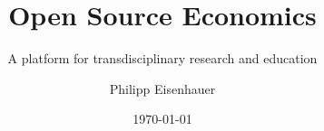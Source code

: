 
\title{Open Source Economics}
\subtitle{A platform for transdisciplinary research and education}
\author{Philipp Eisenhauer}
\date{\today}

\begin{frame}[standout]{~}\titlepage\end{frame}
